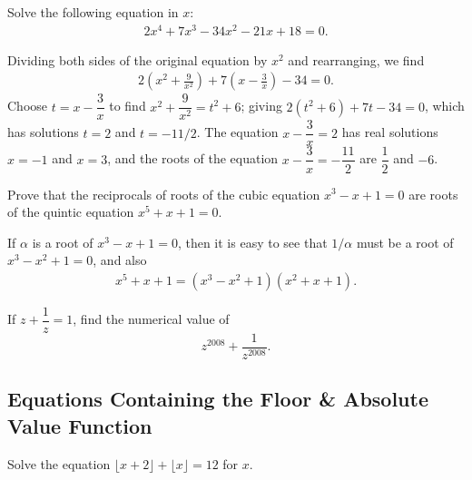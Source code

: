\begin{question}
    Solve the following equation in $x$:
    \begin{align*}
        2x^4+7x^3-34x^2-21x+18=0.
    \end{align*}
\end{question}

\begin{solution}
    Dividing both sides of the original equation by $x^2$ and rearranging, we find 
    \begin{align*}
        2\left(x^2+\frac{9}{x^2}\right) + 7\left(x-\frac{3}{x}\right) - 34=0.
    \end{align*}
    Choose $t=x-\dfrac{3}{x}$ to find $x^2+\dfrac{9}{x^2}=t^2+6$; giving $2(t^2+6)+7t-34=0$, which has solutions $t=2$ and $t=-11/2$. The equation $x-\dfrac{3}{x}=2$ has real solutions $x=-1$ and $x=3$, and the roots of the equation $x-\dfrac{3}{x}=-\dfrac{11}{2}$ are $\dfrac{1}{2}$ and $-6$. 
\end{solution}


\begin{question}
    Prove that the reciprocals of roots of the cubic equation $x^3-x+1=0$ are roots of the quintic equation $x^5+x+1=0$.
\end{question}

\begin{solution}
    If $\alpha$ is a root of $x^3-x+1=0$, then it is easy to see that $1/\alpha$ must be a root of $x^3-x^2+1=0$, and also
    \begin{align*}
        x^5+x+1 = (x^3-x^2+1)(x^2+x+1).
    \end{align*}
\end{solution}



\begin{question}[name={2008 Ecuador TST}]
    If $z+\dfrac{1}{z}=1$, find the numerical value of \[z^{2008}+\frac{1}{z^{2008}}.\]
\end{question}



\subsection{Equations Containing the Floor \& Absolute Value Function}

\begin{question}
    Solve the equation $\lfloor x+2 \rfloor + \lfloor x \rfloor = 12$ for $x$.
\end{question}

